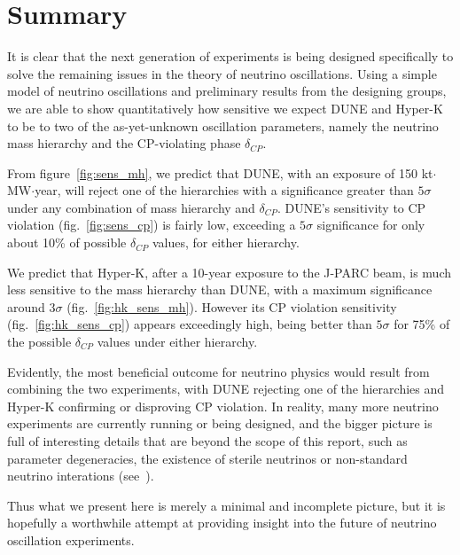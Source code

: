 \label{ch:conclusion}
\section{Summary}
It is clear that the next generation of experiments
is being designed specifically to solve the remaining issues in the theory of
neutrino oscillations. Using a simple model of neutrino oscillations and
preliminary results from the designing groups, we are able to show
quantitatively how sensitive we expect DUNE and Hyper-K to be to two of the
as-yet-unknown oscillation parameters, namely the neutrino mass hierarchy and
the CP-violating phase $\delta_{CP}$.

From figure~\ref{fig:sens_mh}, we predict that DUNE, with an exposure of 150
kt$\cdot$MW$\cdot$year, will reject one of the hierarchies with a significance
greater than $5\sigma$ under any combination of mass hierarchy and
$\delta_{CP}$. DUNE's sensitivity to CP violation (fig.~\ref{fig:sens_cp}) is
fairly low, exceeding a $5\sigma$ significance for only about 10\% of possible
$\delta_{CP}$ values, for either hierarchy.

We predict that Hyper-K, after a 10-year exposure to the J-PARC beam, is
much less sensitive to the mass hierarchy than DUNE, with a maximum
significance around $3\sigma$ (fig.~\ref{fig:hk_sens_mh}). However its CP violation
sensitivity (fig.~\ref{fig:hk_sens_cp}) appears exceedingly high, being better than
$5\sigma$ for 75\% of the possible $\delta_{CP}$ values under either hierarchy.

Evidently, the most beneficial outcome for neutrino physics would result from
combining the two experiments, with DUNE rejecting one of the hierarchies and
Hyper-K confirming or disproving CP violation. In reality, many more neutrino
experiments are currently running or being designed, and the bigger picture is
full of interesting details that are beyond the scope of this report, such as
parameter degeneracies, the existence of sterile neutrinos or non-standard
neutrino interations (see~\cite{raut}).

Thus what we present here is merely a minimal and incomplete picture, but it is
hopefully a worthwhile attempt at providing insight into the future of neutrino
oscillation experiments.



